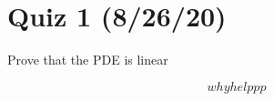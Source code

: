 \section*{Quiz 1 (8/26/20)}
\begin{problem}
    Prove that the PDE is linear
\end{problem}
\begin{solution}
   \[
why helppp
   \]
\end{solution}

